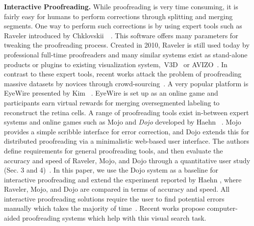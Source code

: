 \textbf{Interactive Proofreading.} While proofreading is very time consuming, it is fairly easy for humans to perform corrections through splitting and merging segments. One way to perform such corrections is by using expert tools such as Raveler introduced by Chklovskii~\etal~\cite{chklovskii2010, raveler}. This software offers many parameters for tweaking the proofreading process. Created in 2010, Raveler is still used today by professional full-time proofreaders and many similar systems exist as stand-alone products or plugins to existing visualization system,~\eg V3D~\cite{proofreading_bottleneck} or AVIZO~\cite{markus_proofreading}. In contrast to these expert tools, recent works attack the problem of proofreading massive datasets by novices through crowd-sourcing~\cite{saalfeld09,anderson2011,Giuly2013DP2}. A very popular platform is EyeWire presented by Kim \etal~\cite{eyewire_nature}. EyeWire is set up as an online game and participants earn virtual rewards for merging oversegmented labeling to reconstruct the retina cells.
A range of proofreading tools exist in-between expert systems and online games such as Mojo and \textit{Dojo} developed by Haehn \etal~\cite{haehn_dojo_2014,Neuroblocks}. Mojo provides a simple scribble interface for error correction, and Dojo extends this for distributed proofreading via a minimalistic web-based user interface. The authors define requirements for general proofreading tools, and then evaluate the accuracy and speed of Raveler, Mojo, and Dojo through a quantitative user study (Sec. 3 and 4)~\cite{haehn_dojo_2014}. In this paper, we use the Dojo system as a baseline for interactive proofreading and extend the experiment reported by Haehn \etal, where Raveler, Mojo, and Dojo are compared in terms of accuracy and speed.
All interactive proofreading solutions require the user to find potential errors manually which takes the majority of time~\cite{proofreading_bottleneck,haehn_dojo_2014}. Recent works propose computer-aided proofreading systems which help with this visual search task.

